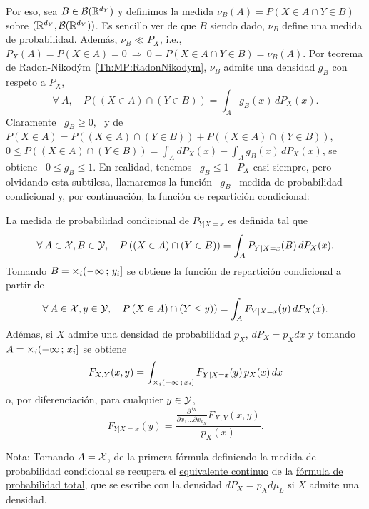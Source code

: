 {Por eso, sea $B \in \mathcal{B}(\mathbb{R}^{d_Y})$ y definimos la medida $\nu_B(A) = P(X \in A
\cap Y  \in B)$ sobre  $(\mathbb{R}^{d_Y},\mathcal{B}(\mathbb{R}^{d_Y}))$.  Es sencillo ver  de que
$B$ siendo dado, $\nu_B$ define una medida de probabilidad. Adem\'as, $\nu_B \ll
P_X$, i.e., $P_X(A) = P(X \in A) = 0  \: \Rightarrow \: 0 = P(X \in A \cap Y \in
B)  =  \nu_B(A)$.    Por  teorema  de  Radon-Nikod\'ym~\ref{Th:MP:RadonNikodym},
$\nu_B$ admite una densidad $g_B$ con respeto a $P_X$,
%
\[
\forall \: A, \quad P\left( (X \in A)  \cap (Y \in B) \right) = \int_A g_B(x) \,
dP_X(x).
\]
%
Claramente \ $g_B \ge 0$,  \ y de \ $P(X \in A) = P\left(  (X \in A) \cap (Y \in
  B) \right) + P\left(  (X \in A) \cap (Y \in B)  \right)$, \ie $\displaystyle 0
\le P\left( (X \in A) \cap (Y \in B) \right) = \int_A dP_X(x) - \int_A g_B(x) \,
dP_X(x)$, se obtiene \ $0 \le g_B \le  1$.  En realidad, tenemos \ $g_B \le 1$ \
$P_X$-casi  siempre, pero olvidando  esta subtilesa,  llamaremos la  funci\'on \
$g_B$ \ medida  de probabilidad condicional y, por  continuaci\'on, la funci\'on
de repartici\'on condicional:
%
\begin{definicion}\label{Def:MP:FRCondicional}
  La medida de probabilidad condicional de $P_{Y|X=x}$ es definida tal que
  \[
  \forall \: A \in \mathcal{X}, B \in \mathcal{Y},  \quad P\left( (X \in A) \cap (Y \in B) \right)
  = \int_A P_{Y|X=x}(B) \, dP_X(x).
  \]
  Tomando $B  = \operatorname*{\times}_i  (-\infty \, ;  \, y_i]$  se obtiene la  funci\'on de
  repartici\'on condicional a partir de
  \[
  \forall \: A \in \mathcal{X}, y \in \mathcal{Y}, \quad P\left (X \in A) \cap (Y \le y) \right) =
  \int_A F_{Y|X=x}(y) \, dP_X(x).
  \]
  Ad\'emas, si $X$ admite una densidad  de probabilidad $p_X$, $dP_X = p_X dx$ y
  tomando $A = \operatorname*{\times}_i (-\infty \, ; \, x_i]$ se obtiene
  \[
  F_{X,Y}(x,y) = \int_{\operatorname*{\times}_i (-\infty \,  ; \, x_i]} F_{Y|X=x}(y) \, p_X(x)
  \, dx
  \]
  o, por diferenciaci\'on, para cualquier $y \in \mathcal{Y}$,
  \[
  F_{Y|X=x}(y)   =  \frac{\frac{\partial^{d_X}}{\partial  x_1   \ldots  \partial
      x_{d_X}} F_{X,Y}(x,y)}{p_X(x)}.
  \]
\end{definicion}
%
\noindent Nota: Tomando $A = \mathcal{X}$,  de la primera f\'ormula definiendo la medida de
probabilidad condicional  se recupera el \underline{equivalente  continuo} de la
\underline{f\'ormula de probabilidad total}, que  se escribe con la densidad $dP_X
= p_X d\mu_L$ si $X$ admite una densidad.

}
